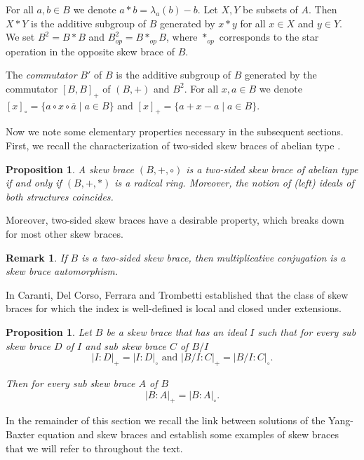 \documentclass{amsart}
\newtheorem{pro}[thm]{Proposition}
\newtheorem{rem}[thm]{Remark}
\begin{document}
For all $a,b\in B$ we denote $a*b=\lambda_a(b)-b$.
Let $X,Y$ be subsets of $A$. Then $X*Y$ is the additive subgroup of $B$ generated by $x*y$ for all $x\in X$ and $y\in Y$.
We set $B^{2}=B*B$ and $B^{2}_{op} = B \ast_{op}B$, where $\ast_{op}$ corresponds to the star operation in the opposite skew brace of $B$.

The \emph{commutator} $B'$ of $B$ is the additive
subgroup of $B$ generated by the commutator $[B, B]_+$ of $(B,+)$ and $B^2$. 
For all $x,a\in B$ we denote 
$[x]_\circ=\{a\circ x \circ \overline{a}\mid a\in B\}$
and
$[x]_+=\{a+x-a\mid a\in B\}$. 

Now we note some elementary properties necessary in the subsequent sections. First, we recall the characterization of two-sided skew braces of abelian type \cite{Lau, MR2278047}.

\begin{pro}
    A skew brace $(B,+,\circ)$ is a two-sided skew brace of abelian type if and only if $(B,+,*)$ is a radical ring. Moreover, the notion of (left) ideals of both structures coincides.
\end{pro}

Moreover, two-sided skew braces have a desirable property, which breaks down for most other skew braces.

\begin{rem}
\label{mult conj in two-sided}
    If $B$ is a two-sided skew brace, then 
    multiplicative conjugation is a skew brace automorphism.
\end{rem}

In \cite{dedekind} Caranti, Del Corso, Ferrara and Trombetti established that the class of skew braces for which the index is well-defined is local and closed under extensions. 

\begin{pro}\label{indexdedekind}
Let $B$ be a skew brace 
that has an ideal $I$ 
such that for every sub skew brace $D$ of $I$ and sub skew brace $C$ of $B/I$
    \[
    |I:D|_+=|I:D|_\circ \text{ and } |B/I:C|_+=|B/I:C|_\circ.
    \]

Then for every sub skew brace $A$ of $B$ 
    \[
    |B:A|_+=|B:A|_\circ. 
    \]
\end{pro}




In the remainder of this section we recall the link between solutions of the Yang-Baxter equation and skew braces and establish some examples of skew braces that we will refer to throughout the text. 
\end{document}
